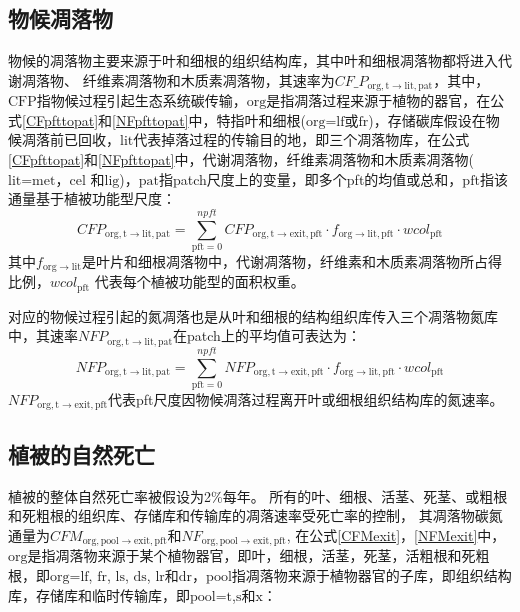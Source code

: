 \subsection{物候凋落物}\label{物候凋落物}
物候的凋落物主要来源于叶和细根的组织结构库，其中叶和细根凋落物都将进入代谢凋落物、
纤维素凋落物和木质素凋落物，其速率为$CF\_P_{\mathrm{org,t\rightarrow lit,pat}}$，其中，${\mathrm {CFP}}$指物候过程引起生态系统碳传输，${\mathrm {org}}$是指凋落过程来源于植物的器官，在公式\eqref{CFpfttopat}和\eqref{NFpfttopat}中，特指叶和细根($\text{org=lf}$或${\mathrm {fr}}$)，存储碳库假设在物候凋落前已回收，${\mathrm {lit}}$代表掉落过程的传输目的地，即三个凋落物库，在公式\eqref{CFpfttopat}和\eqref{NFpfttopat}中，代谢凋落物，纤维素凋落物和木质素凋落物($\text{lit=met}$，${\mathrm {cel}}$ 和${\mathrm {lig}}$)，${\mathrm {pat}}$指patch尺度上的变量，即多个pft的均值或总和，${\mathrm {pft}}$指该通量基于植被功能型尺度：
\begin{equation}\label{CFpfttopat}
  CFP_{\mathrm{org,t\rightarrow lit,pat}}=\sum_{\mathrm{pft=0}}^{npft}{CFP_{\mathrm{org,t \rightarrow exit,pft}}\cdot f_{\mathrm{{org\rightarrow lit},pft}}\cdot{wcol_{\mathrm{pft}}}}
\end{equation}
其中$f_{\mathrm{org\rightarrow lit}}$是叶片和细根凋落物中，代谢凋落物，纤维素和木质素凋落物所占得比例，${wcol_{\mathrm{pft}}}$ 代表每个植被功能型的面积权重。

对应的物候过程引起的氮凋落也是从叶和细根的结构组织库传入三个凋落物氮库中，其速率$NFP_{\mathrm{org,t\rightarrow lit,pat}}$在patch上的平均值可表达为：
\begin{equation}\label{NFpfttopat}
  NFP_{\mathrm{org,t\rightarrow lit,pat}}=\sum_{\mathrm{pft=0}}^{npft}{NFP_{\mathrm{org,t \rightarrow exit,pft}}\cdot f_{\mathrm {org \rightarrow lit,pft}}\cdot {wcol_{\mathrm{pft}}}}
\end{equation}
$NFP_{\mathrm{org,t \rightarrow exit,pft}}$代表pft尺度因物候凋落过程离开叶或细根组织结构库的氮速率。

\subsection{植被的自然死亡}\label{植被的自然死亡}
植被的整体自然死亡率被假设为2\%每年。
所有的叶、细根、活茎、死茎、或粗根和死粗根的组织库、存储库和传输库的凋落速率受死亡率的控制，
其凋落物碳氮通量为$CFM_{\mathrm{org,pool\rightarrow exit,pft}}$和$NF_{\mathrm{org,pool\rightarrow exit,pft}}$, 在公式\eqref{CFMexit}，\eqref{NFMexit}中，${\mathrm {org}}$是指凋落物来源于某个植物器官，即叶，细根，活茎，死茎，活粗根和死粗根，即$\text{org=lf}$, ${\mathrm {fr}}$, ${\mathrm {ls}}$, ${\mathrm {ds}}$, ${\mathrm {lr}}$和${\mathrm {dr}}$，${\mathrm {pool}}$指凋落物来源于植物器官的子库，即组织结构库，存储库和临时传输库，即$\text{pool=t}$,${\mathrm {s}}$和${\mathrm {x}}$：

